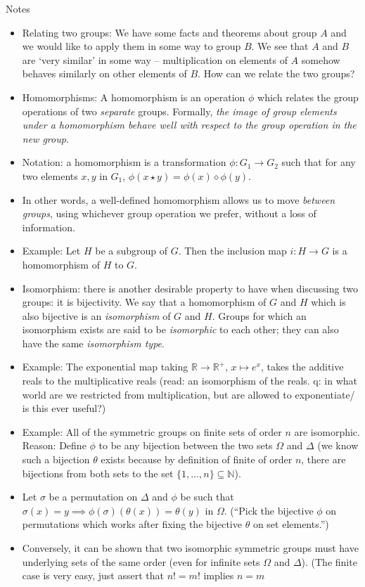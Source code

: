 \documentclass[1    0pt, answers]{exam} \renewcommand{\baselinestretch}{1.05}
\theoremstyle{plain}
\theoremstyle{definition}
\begin{document}
\begin{questions}
Notes 
\begin{itemize}
\item Relating two groups: We have some facts and theorems about group $A$ and we would like to apply them in some way to group $B$. We see that $A$ and $B$ are `very similar' in some way -- multiplication on elements of $A$ somehow behaves similarly on other elements of $B$. How can we relate the two groups?
\item Homomorphisms: A homomorphism is an operation $\phi$ which relates the group operations of two \emph{separate} groups. Formally, \emph{the image of group elements under a homomorphism behave well with respect to the group operation in the new group}.
\item Notation: a homomorphism is a transformation $\phi : G_1 \to G_2$ such that for any two elements $x, y$ in $G_1$, $\phi(x \star y) = \phi(x) \diamond \phi(y)$.
\item In other words, a well-defined homomorphism allows us to move \emph{between groups}, using whichever group operation we prefer, without a loss of information.
\item Example: Let $H$ be a subgroup of $G$. Then the inclusion map $ i : H \to G$ is a homomorphism of $H$ to $G$.
\item Isomorphism: there is another desirable property to have when discussing two groups: it is bijectivity. We say that a homomorphism  of $G$ and $H$ which is also bijective is an \emph{isomorphism} of $G$ and $H$. Groups for which an isomorphism exists are said to be \emph{isomorphic} to each other; they can also have the same \emph{isomorphism type}.
\item Example: The exponential map taking $\mathbb{R} \to \mathbb{R}^{+}$, $x \mapsto e^{x}$, takes the additive reals to the multiplicative reals (read: an isomorphism of the reals. q: in what world are we restricted from multiplication, but are allowed to exponentiate/ is this ever useful?)
\item Example: All of the symmetric groups on finite sets of order $n$ are isomorphic. Reason: Define $\phi$ to be any bijection between the two sets $\Omega$ and $\Delta$ (we know such a bijection $\theta$ exists because by definition of finite of order $n$, there are bijections from both sets to the set $\{1, \ldots, n \} \subseteq \mathbb{N}$). 
\item Let $\sigma$ be a permutation on $\Delta$ and $\phi$ be such that $\sigma(x) = y \implies \phi(\sigma)(\theta(x)) = \theta(y)$ in $\Omega$. (``Pick the bijective $\phi$ on permutations which works after fixing the bijective $\theta$ on set elements.'')
\item Conversely, it can be shown that two isomorphic symmetric groups must have underlying sets of the same order (even for infinite sets $\Omega$ and $\Delta$). (The finite case is very easy, just assert that $n! = m!$ implies $n = m$ %
\end{itemize}


\end{questions}
\end{document}
